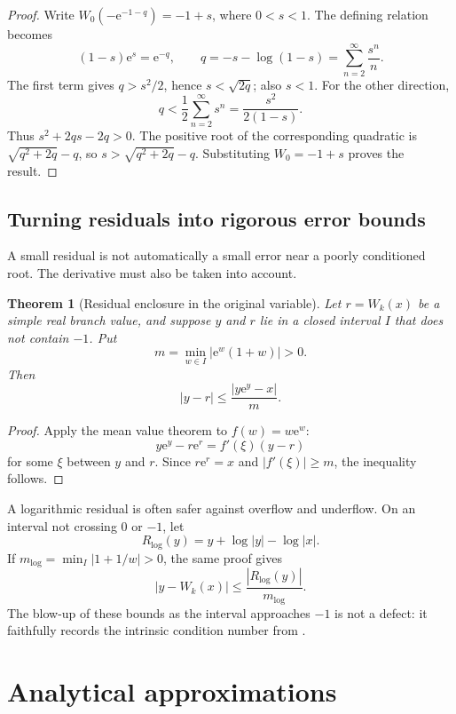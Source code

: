 \documentclass[11pt,openany]{book}
\newcommand{\e}{\mathrm{e}}
\newcommand{\abs}[1]{\left|#1\right|}
\theoremstyle{plain}
\newtheorem{theorem}{Theorem}[chapter]
\theoremstyle{definition}
\theoremstyle{remark}
\begin{document}
\begin{proof}
Write \(W_0(-\e^{-1-q})=-1+s\), where \(0<s<1\).  The defining relation
becomes
\[
       (1-s)\e^s=\e^{-q},
       \qquad
       q=-s-\log(1-s)=\sum_{n=2}^{\infty}\frac{s^n}{n}.
\]
The first term gives \(q>s^2/2\), hence \(s<\sqrt{2q}\); also \(s<1\).
For the other direction,
\[
 q<\frac12\sum_{n=2}^{\infty}s^n
   =\frac{s^2}{2(1-s)}.
\]
Thus \(s^2+2qs-2q>0\).  The positive root of the corresponding quadratic is
\(\sqrt{q^2+2q}-q\), so
\(s>\sqrt{q^2+2q}-q\).  Substituting \(W_0=-1+s\) proves the result.
\end{proof}

\section{Turning residuals into rigorous error bounds}
A small residual is not automatically a small error near a poorly conditioned
root.  The derivative must also be taken into account.

\begin{theorem}[Residual enclosure in the original variable]
Let \(r=W_k(x)\) be a simple real branch value, and suppose \(y\) and \(r\)
lie in a closed interval \(I\) that does not contain \(-1\).  Put
\[
       m=\min_{w\in I}\abs{\e^w(1+w)}>0.
\]
Then
\begin{equation}\label{eq:residualbound}
       \abs{y-r}\le
       \frac{\abs{y\e^y-x}}{m}.
\end{equation}
\end{theorem}

\begin{proof}
Apply the mean value theorem to \(f(w)=w\e^w\):
\[
 y\e^y-r\e^r=f'(\xi)(y-r)
\]
for some \(\xi\) between \(y\) and \(r\).  Since \(r\e^r=x\) and
\(\abs{f'(\xi)}\ge m\), the inequality follows.
\end{proof}

A logarithmic residual is often safer against overflow and underflow.  On an
interval not crossing \(0\) or \(-1\), let
\[
       R_{\log}(y)=y+\log\abs y-\log\abs x.
\]
If
\(m_{\log}=\min_I\abs{1+1/w}>0\), the same proof gives
\begin{equation}\label{eq:logresidualbound}
       \abs{y-W_k(x)}\le\frac{\abs{R_{\log}(y)}}{m_{\log}}.
\end{equation}
The blow-up of these bounds as the interval approaches \(-1\) is not a defect:
it faithfully records the intrinsic condition number from
.

\chapter{Analytical approximations}\label{chap:approx}
\end{document}
